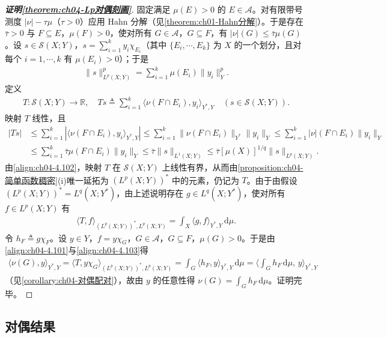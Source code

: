 \documentclass[../../main.tex]{subfiles}%
\begin{document}
\begin{proof}[\textbf{证明\cref{theorem:ch04-Lp对偶刻画}}]
固定满足 $\mu(E)>0$ 的 $E\in\mathcal{A}$。对有限带号测度 $|\nu|-\tau\mu$（$\tau>0$）应用 Hahn 分解（见\cref{theorem:ch01-Hahn分解}）。于是存在 $\bar\tau>0$ 与 $F\subseteq E$，$\mu(F)>0$，使对所有 $G\in\mathcal{A}$，$G\subseteq F$，有 $|\nu|(G)\leqslant\bar\tau\mu(G)$。设 $s\in\mathcal{S}(X;Y)$，$s=\sum_{i=1}^k y_i\chi_{E_i}$（其中 $\{E_i,\cdots ,E_k\}$ 为 $X$ 的一个划分，且对每个 $i=1,\cdots ,k$ 有 $\mu(E_i)>0$）；于是
\begin{align*}
\|s\|_{L^p(X;Y)}^p=\sum_{i=1}^k\mu(E_i)\|y_i\|_Y^p.
\end{align*}
定义
\begin{align}
T:\mathcal{S}(X;Y)\to\mathbb{R},\quad Ts\triangleq \sum_{i=1}^k\langle\nu(F\cap E_i),y_i\rangle_{Y^*,Y}\quad(s\in\mathcal{S}(X;Y)). \label{align:ch04-4.101}
\end{align}
映射 $T$ 线性，且
\begin{align}
|Ts|&\leqslant\sum_{i=1}^k|\langle\nu(F\cap E_i),y_i\rangle_{Y^*,Y}|
\leqslant\sum_{i=1}^k\|\nu(F\cap E_i)\|_{Y^*}\|y_i\|_Y
\leqslant\sum_{i=1}^k|\nu|(F\cap E_i)\|y_i\|_Y\nonumber\\
&\leqslant\sum_{i=1}^k\bar\tau\mu(F\cap E_i)\|y_i\|_Y\leqslant\bar\tau\|s\|_{L^1(X;Y)}\leqslant\bar\tau[\mu(X)]^{1/q}\|s\|_{L^p(X;Y)}. \label{align:ch04-4.102}
\end{align}
由\eqref{align:ch04-4.102}，映射 $T$ 在 $\mathcal{S}(X;Y)$ 上线性有界，从而由\cref{proposition:ch04-简单函数稠密}(i)唯一延拓为 $(L^p(X;Y))^*$ 中的元素，仍记为 $T$。由于由假设 $(L^p(X;Y))^*=L^q(X;Y^*)$，由上述说明存在 $g\in L^q(X;Y^*)$，使对所有 $f\in L^p(X;Y)$ 有
\begin{align}
\langle T,f\rangle_{(L^p(X;Y))^*,L^p(X;Y)}=\int_X\langle g,f\rangle_{Y^*,Y}\,\mathrm{d}\mu. \label{align:ch04-4.103}
\end{align}
令 $h_F\triangleq g\chi_F$。设 $y\in Y$，$f=y\chi_G$，$G\in\mathcal{A}$，$G\subseteq F$，$\mu(G)>0$。于是由\eqref{align:ch04-4.101}与\eqref{align:ch04-4.103}得
\begin{align*}
\langle\nu(G),y\rangle_{Y^*,Y}=\langle T,y\chi_G\rangle_{(L^p(X;Y))^*,L^p(X;Y)}
=\int_G\langle h_F,y\rangle_{Y^*,Y}\,\mathrm{d}\mu
=\Big\langle\int_G h_F\,\mathrm{d}\mu,\,y\Big\rangle_{Y^*,Y}
\end{align*}
（见\cref{corollary:ch04-对偶配对}），故由 $y$ 的任意性得 $\nu(G)=\int_G h_F\,\mathrm{d}\mu$。证明完毕。
\end{proof}

\subsection{对偶结果}\label{subsection:ch04-对偶结果}
\end{document}
